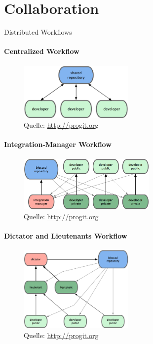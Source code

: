 \section{Collaboration}

\begin{frame}
  \tableofcontents[currentsection]
\end{frame}

\begin{frame}[allowframebreaks]{Distributed Workflows}
  \framesubtitle{Centralized Workflow}
  \begin{figure}
    \includegraphics[width=0.5\textwidth]{img/wf-centralized}
    \caption[format=empty]{Quelle: \url{http://progit.org}}
  \end{figure}
  \framebreak
    
  \framesubtitle{Integration-Manager Workflow}
  \begin{figure}
    \includegraphics[width=0.6\textwidth]{img/wf-integration-manager}
    \caption[format=empty]{Quelle: \url{http://progit.org}}
  \end{figure}
  \framebreak

  \framesubtitle{Dictator and Lieutenants Workflow}
  \begin{figure}
   \includegraphics[width=0.5\textwidth]{img/wf-dictator}
    \caption[format=empty]{Quelle: \url{http://progit.org}}
  \end{figure}
\end{frame}

